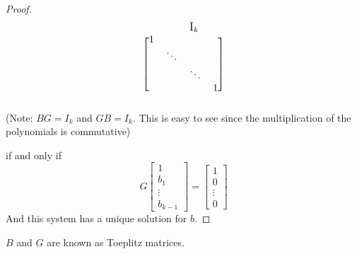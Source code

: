 \begin{proof}
\begin{equation*}
\begin{blockarray}{cclc}
            & & \text{\large I}_k &  \\
           \begin{block}{[cccc]}
                1       &           &          &   \\
                        & \ddots    &          &   \\
                        &           & \ddots   &   \\
                        &           &          & 1 \\
            \end{block}
       \end{blockarray}
    \end{equation*}
    (Note: $BG = I_k$ and $GB = I_k$. This is easy to see since the multiplication of the polynomials is commutative)

    if and only if
    \begin{equation*}
        G
        \begin{bmatrix}
            1 \\ b_1 \\ \vdots \\ b_{k-1}
        \end{bmatrix}
        =
        \begin{bmatrix}
            1 \\ 0 \\ \vdots \\ 0
        \end{bmatrix}
    \end{equation*}
    And this system has a unique solution for $b$.
\end{proof}

\begin{note}
    $B$ and $G$ are known as Toeplitz matrices.
\end{note}








